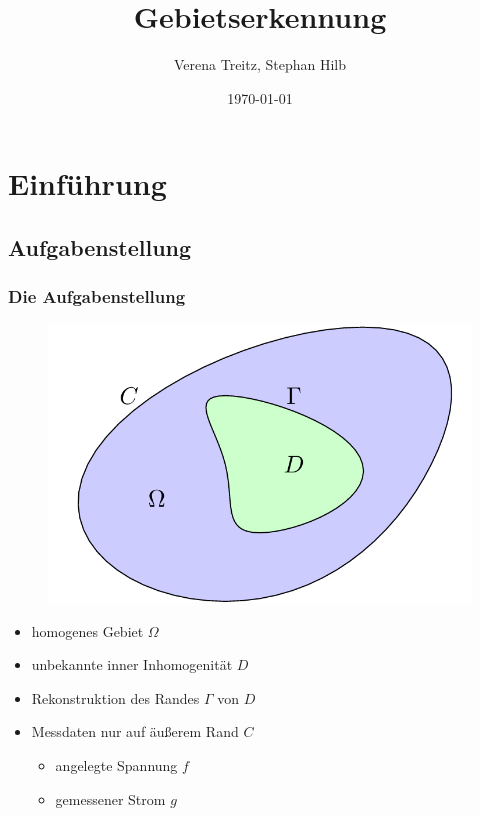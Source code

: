 \documentclass[draft]{beamer}
\title{Gebietserkennung}
\author{Verena Treitz, Stephan Hilb}
\date{\today}
\begin{document}
\begin{frame}
	\titlepage
\end{frame}

\section{Einführung}

\subsection{Aufgabenstellung}

\begin{frame}
	\frametitle{Die Aufgabenstellung}
	\begin{minipage}{0.60\textwidth}
		\begin{figure}
			\centering
			\includegraphics[width=\textwidth]{tikz/basic.png}
		\end{figure}
	\end{minipage}
	\hfill
	\begin{minipage}{0.38\textwidth}
		\begin{itemize}
			\item \pause
				homogenes Gebiet $\Omega$
			\item
				unbekannte inner Inhomogenität $D$
			\item
				Rekonstruktion des Randes $\Gamma$ von $D$
			\item \pause
				Messdaten nur auf äußerem Rand $C$
				\begin{itemize}
					\item
						angelegte Spannung $f$
					\item
						gemessener Strom $g$
				\end{itemize}
		\end{itemize}
	\end{minipage}
\end{frame}
\end{document}

